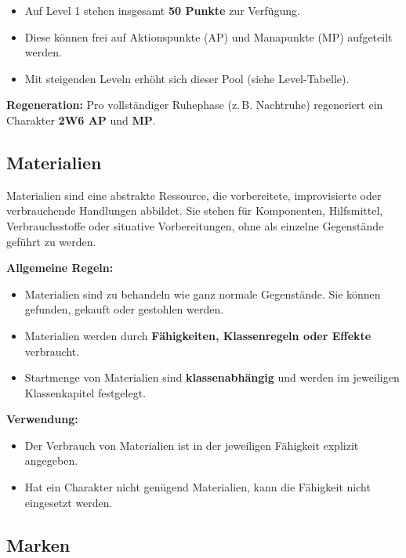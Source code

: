 \begin{itemize}
	\item Auf Level 1 stehen insgesamt \textbf{50 Punkte} zur Verfügung.
	\item Diese können frei auf Aktionspunkte (AP) und Manapunkte (MP)
	aufgeteilt werden.
	\item Mit steigenden Leveln erhöht sich dieser Pool
	(siehe Level-Tabelle).
\end{itemize}

\textbf{Regeneration:}  
Pro vollständiger Ruhephase (z.\,B. Nachtruhe) regeneriert ein Charakter
\textbf{2W6 AP} und \textbf{MP}.

\subsection*{Materialien}

\begin{rulebox}{Materialien}
	 sind eine abstrakte Ressource,
	die vorbereitete, improvisierte oder verbrauchende Handlungen abbildet.
	Sie stehen für Komponenten, Hilfsmittel, Verbrauchsstoffe oder situative
	Vorbereitungen, ohne als einzelne Gegenstände geführt zu werden.
\end{rulebox}

\textbf{Allgemeine Regeln:}
\begin{itemize}
	\item Materialien sind zu behandeln wie ganz normale Gegenstände. Sie können gefunden, gekauft oder gestohlen werden.
	\item Materialien werden durch \textbf{Fähigkeiten,
		Klassenregeln oder Effekte} verbraucht.
	\item Startmenge von Materialien sind
	\textbf{klassenabhängig} und werden im jeweiligen Klassenkapitel festgelegt. 
\end{itemize}

\textbf{Verwendung:}
\begin{itemize}
	\item Der Verbrauch von Materialien ist in der jeweiligen Fähigkeit
	explizit angegeben.
	\item Hat ein Charakter nicht genügend Materialien, kann die Fähigkeit
	nicht eingesetzt werden.
\end{itemize}

\subsection*{Marken}

